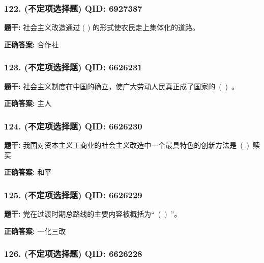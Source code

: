 \documentclass[12pt,UTF8]{ctexart}
\begin{document}
\subsubsection*{122. (不定项选择题) \small QID: 6927387}

\textbf{题干:}
社会主义改造通过 ( ) 的形式使农民走上集体化的道路。

\textbf{正确答案:}
合作社

\vspace{0.3em}\hrulefill\vspace{0.7em}

\subsubsection*{123. (不定项选择题) \small QID: 6626231}

\textbf{题干:}
社会主义制度在中国的确立，使广大劳动人民真正成了国家的 ( ) 。

\textbf{正确答案:}
主人

\vspace{0.3em}\hrulefill\vspace{0.7em}

\subsubsection*{124. (不定项选择题) \small QID: 6626230}

\textbf{题干:}
我国对资本主义工商业的社会主义改造中一个最具特色的创新方法是 ( ) 赎买

\textbf{正确答案:}
和平

\vspace{0.3em}\hrulefill\vspace{0.7em}

\subsubsection*{125. (不定项选择题) \small QID: 6626229}

\textbf{题干:}
党在过渡时期总路线的主要内容被概括为“ ( ) ”。

\textbf{正确答案:}
一化三改

\vspace{0.3em}\hrulefill\vspace{0.7em}

\subsubsection*{126. (不定项选择题) \small QID: 6626228}
\end{document}
